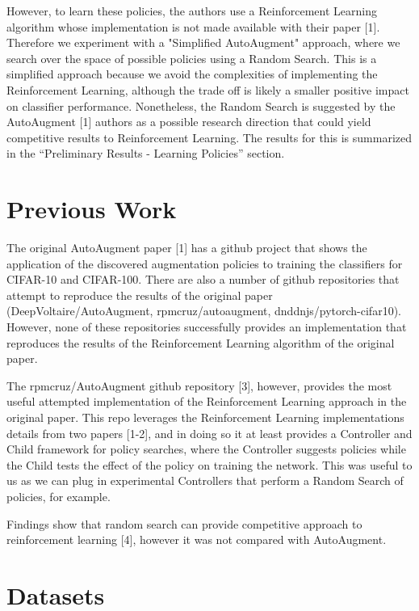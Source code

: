 \documentclass[10pt,twocolumn,letterpaper]{article}
\begin{document}
However, to learn these policies, the authors use a Reinforcement Learning algorithm whose implementation is not made available with their paper [1].  Therefore we experiment with a "Simplified AutoAugment" approach, where we search over the space of possible policies using a Random Search.  This is a simplified approach because we avoid the complexities of implementing the Reinforcement Learning, although the trade off is likely a smaller positive impact on classifier performance.  Nonetheless, the Random Search is suggested by the AutoAugment [1] authors as a possible research direction that could yield competitive results to Reinforcement Learning. The results for this is summarized in the “Preliminary Results - Learning Policies” section.

\section{Previous Work}

The original AutoAugment paper [1] has a github project that shows the application of the discovered augmentation policies to training the classifiers for CIFAR-10 and CIFAR-100.  There are also a number of github repositories that attempt to reproduce the results of the original paper (DeepVoltaire/AutoAugment, rpmcruz/autoaugment, dnddnjs/pytorch-cifar10).  However, none of these repositories successfully provides an implementation that reproduces the results of the Reinforcement Learning algorithm of the original paper.

The rpmcruz/AutoAugment github repository [3], however, provides the most useful attempted implementation of the Reinforcement Learning approach in the original paper.  This repo leverages the Reinforcement Learning implementations details from two papers [1-2], and in doing so it at least provides a Controller and Child framework for policy searches, where the Controller suggests policies while the Child tests the effect of the policy on training the network.  This was useful to us as we can plug in experimental Controllers that perform a Random Search of policies, for example.

Findings show that random search can provide competitive approach to reinforcement learning [4], however it was not compared with AutoAugment.

\section{Datasets}
\end{document}
